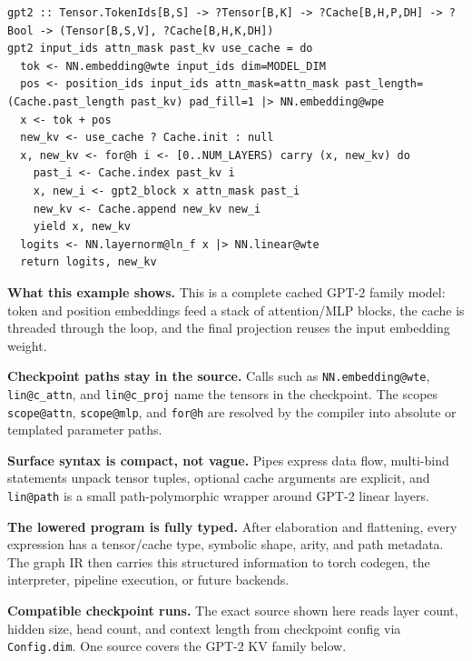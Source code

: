 \documentclass{article}
\newcommand{\code}[1]{\texttt{#1}}
\begin{document}
\begin{tcolorbox}[posterbox,title={Full GPT-2 KV Axon Model}]
\begin{minipage}[t]{0.66\linewidth}
\begin{tcolorbox}[codebox]
\begin{lstlisting}[basicstyle=\ttfamily\fontsize{18.4}{19.8}\selectfont]
gpt2 :: Tensor.TokenIds[B,S] -> ?Tensor[B,K] -> ?Cache[B,H,P,DH] -> ?Bool -> (Tensor[B,S,V], ?Cache[B,H,K,DH])
gpt2 input_ids attn_mask past_kv use_cache = do
  tok <- NN.embedding@wte input_ids dim=MODEL_DIM
  pos <- position_ids input_ids attn_mask=attn_mask past_length=(Cache.past_length past_kv) pad_fill=1 |> NN.embedding@wpe
  x <- tok + pos
  new_kv <- use_cache ? Cache.init : null
  x, new_kv <- for@h i <- [0..NUM_LAYERS) carry (x, new_kv) do
    past_i <- Cache.index past_kv i
    x, new_i <- gpt2_block x attn_mask past_i
    new_kv <- Cache.append new_kv new_i
    yield x, new_kv
  logits <- NN.layernorm@ln_f x |> NN.linear@wte
  return logits, new_kv
\end{lstlisting}
\end{tcolorbox}
\end{minipage}
\hfill
\begin{minipage}[t]{0.32\linewidth}
\vspace{0pt}
\begin{tcolorbox}[accentbox]
{\raggedright\fontsize{22}{28}\selectfont
\textbf{What this example shows.} This is a complete cached GPT-2 family model:
token and position embeddings feed a stack of attention/MLP blocks, the cache is
threaded through the loop, and the final projection reuses the input embedding
weight.\par\medskip

\textbf{Checkpoint paths stay in the source.} Calls such as \code{NN.embedding@wte},
\code{lin@c\_attn}, and \code{lin@c\_proj} name the tensors in the checkpoint.
The scopes \code{scope@attn}, \code{scope@mlp}, and \code{for@h} are resolved by
the compiler into absolute or templated parameter paths.\par\medskip

\textbf{Surface syntax is compact, not vague.} Pipes express data flow, multi-bind
statements unpack tensor tuples, optional cache arguments are explicit, and
\code{lin@path} is a small path-polymorphic wrapper around GPT-2 linear layers.\par
\medskip

\textbf{The lowered program is fully typed.} After elaboration and flattening,
every expression has a tensor/cache type, symbolic shape, arity, and path
metadata. The graph IR then carries this structured information to torch
codegen, the interpreter, pipeline execution, or future backends.\par}
\end{tcolorbox}
\vspace{3mm}
\begin{tcolorbox}[accentbox]
{\raggedright\fontsize{21}{26}\selectfont
\textbf{Compatible checkpoint runs.} The exact source shown here reads layer
count, hidden size, head count, and context length from checkpoint config via
\code{Config.dim}. One source covers the GPT-2 KV family below.\par\medskip

}
\end{tcolorbox}
\end{minipage}
\end{tcolorbox}
\end{document}
